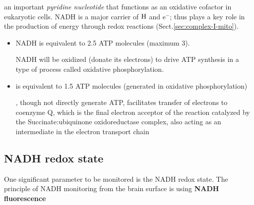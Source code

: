 an important {\it pyridine
nucleotide} that functions as an oxidative cofactor in eukaryotic cells. NADH
is a major carrier of $\ce{H}$ and e$^{-}$; thus plays a key role in the
production of energy through redox reactions (Sect.\ref{sec:complex-I-mito}).

\begin{itemize}
  \item NADH is equivalent to 2.5 ATP molecules (maximum 3).

  NADH will be oxidized (donate its electrons) to drive ATP synthesis in a type
  of process called oxidative phosphorylation.

  \item {} is equivalent to 1.5 ATP molecules (generated in oxidative
  phosphorylation)

   , though not directly generate ATP, facilitates transfer of electrons to
   coenzyme Q, which is the final electron acceptor of the reaction catalyzed by
   the Succinate:ubiquinone oxidoreductase complex, also acting as an
   intermediate in the electron transport chain
\end{itemize}

\subsection{NADH redox state}
\label{sec:NADH-redox-state}

One significant parameter to be monitored is the NADH redox state.
The principle of NADH monitoring from the brain surface is using {\bf NADH
fluorescence}


